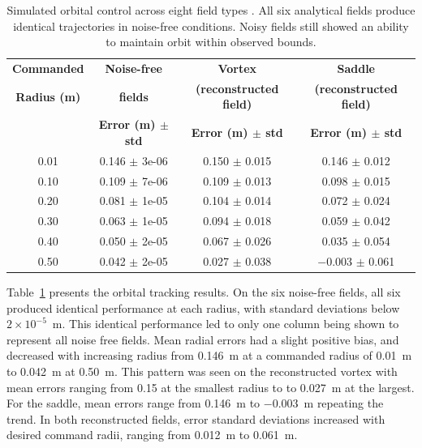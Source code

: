 \documentclass[lettersize,journal]{IEEEtran}
\begin{document}
\begin{table}[!t]
    \centering
    \caption{Simulated orbital control across eight field types . All six analytical fields produce identical trajectories in noise-free conditions. Noisy fields still showed an ability to maintain orbit within observed bounds.}
    \label{tab:simulation_orbital_results}
    \footnotesize
    \setlength{\tabcolsep}{3pt}
    \begin{tabular}{cccc}
    \hline
    \textbf{Commanded} & \textbf{Noise-free} & \textbf{Vortex} & \textbf{Saddle} \\
    \textbf{Radius (m)} & \textbf{fields} & \textbf{(reconstructed field)} & \textbf{(reconstructed field)} \\
     & \textbf{Error (m) $\pm$ std} & \textbf{Error (m) $\pm$ std} & \textbf{Error (m) $\pm$ std} \\
    \hline
    0.01 & 0.146 $\pm$ 3e-06 & 0.150 $\pm$ 0.015 & 0.146 $\pm$ 0.012 \\
    0.10 & 0.109 $\pm$ 7e-06 & 0.109 $\pm$ 0.013 & 0.098 $\pm$ 0.015 \\
    0.20 & 0.081 $\pm$ 1e-05 & 0.104 $\pm$ 0.014 & 0.072 $\pm$ 0.024 \\
    0.30 & 0.063 $\pm$ 1e-05 & 0.094 $\pm$ 0.018 & 0.059 $\pm$ 0.042 \\
    0.40 & 0.050 $\pm$ 2e-05 & 0.067 $\pm$ 0.026 & 0.035 $\pm$ 0.054 \\
    0.50 & 0.042 $\pm$ 2e-05 & 0.027 $\pm$ 0.038 & $-$0.003 $\pm$ 0.061 \\

    \hline
    \end{tabular}
    \end{table}


    Table~\ref{tab:simulation_orbital_results} presents the orbital tracking results. On the six noise-free fields, all six produced identical
    performance at each radius, with standard deviations below $2 \times 10^{-5}$~m. This identical performance led to only one column being shown to represent all noise free fields. Mean radial errors had a slight positive bias, and decreased with increasing radius from 0.146~m at a commanded radius of 0.01~m to 0.042~m at 0.50~m. This pattern was seen on the reconstructed vortex with mean errors ranging from 0.15 at the smallest radius to to 0.027~m at the largest. For the saddle, mean errors range from 0.146~m to $-0.003$~m repeating the trend. In both reconstructed fields, error standard deviations increased with desired command radii, ranging from 0.012~m to 0.061~m.    
\end{document}
